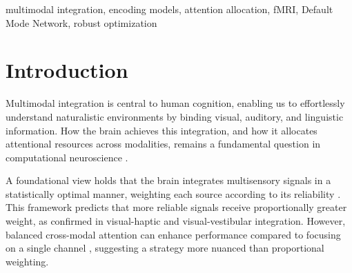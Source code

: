 \documentclass[conference]{IEEEtran}
\begin{document}
\begin{abstract}
How does the brain allocate attention across sensory modalities during multimodal integration? Classical Bayesian frameworks predict that efficient systems weight each modality in proportion to its encoding strength. We tested this prediction using fMRI data from four participants watching naturalistic movies ($\sim$65 hours). Through unimodal encoding models and a personalized multimodal neural network with learnable modality weights, we found a striking dissociation: visual features dominated encoding (mean $r = 0.204$, 91\% of brain regions), yet the learned attention weights remained balanced ($\sim$33\% per modality). We term this the Encoding-Attention Dissociation. The finding persisted when restricting analysis to high-encoding regions ($r > 0.2$, 407 regions), under end-to-end retraining, and with alternative feature extractors (CLIP, Wav2Vec2, GPT-2). The Default Mode Network emerged as the primary integration hub (Multimodal Integration Index = 0.744), with integration following a gradient from sensory to transmodal cortex. These results are consistent with the possibility that multimodal integration in the brain favors robustness over narrow efficiency, maintaining balanced attention regardless of encoding strength.
\end{abstract}

\begin{IEEEkeywords}
multimodal integration, encoding models, attention allocation, fMRI, Default Mode Network, robust optimization
\end{IEEEkeywords}

\section{Introduction}

Multimodal integration is central to human cognition, enabling us to effortlessly understand naturalistic environments by binding visual, auditory, and linguistic information. How the brain achieves this integration, and how it allocates attentional resources across modalities, remains a fundamental question in computational neuroscience \cite{stein1993merging, beauchamp2004unraveling}.

A foundational view holds that the brain integrates multisensory signals in a statistically optimal manner, weighting each source according to its reliability \cite{ernst2002humans, knill2004bayesian}. This framework predicts that more reliable signals receive proportionally greater weight, as confirmed in visual-haptic \cite{ernst2002humans} and visual-vestibular \cite{fetsch2013bridging} integration. However, balanced cross-modal attention can enhance performance compared to focusing on a single channel \cite{mishra2012attention}, suggesting a strategy more nuanced than proportional weighting.
\end{document}
